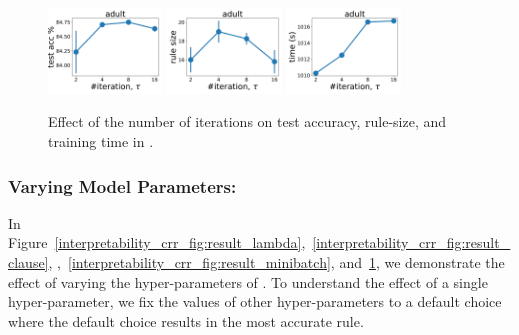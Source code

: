 \begin{figure}[t]
	\subfloat
	{\includegraphics[width=0.27\textwidth]{figures/interpretability/relaxed-cnf/adult_test_accuracy_vary_iteration.pdf}}
	\subfloat
	{\includegraphics[width=0.27\textwidth]{figures/interpretability/relaxed-cnf/adult_rule_size_vary_iteration.pdf}}
	\subfloat
	{\includegraphics[width=0.27\textwidth]{figures/interpretability/relaxed-cnf/adult_time_vary_iteration.pdf}} 
	\\
	
	
	\caption[Effect of the number of iterations in {\crr}]{Effect of the number of iterations on test accuracy, rule-size, and training time in {\crr}. } 
	\label{interpretability_crr_fig:result_iteration}
\end{figure}





	

	\subsubsection*{Varying Model Parameters: }
	\label{interpretability_crr_sec:model_parameters}
	In Figure~\ref{interpretability_crr_fig:result_lambda},~\ref{interpretability_crr_fig:result_clause}, ,~\ref{interpretability_crr_fig:result_minibatch}, and~\ref{interpretability_crr_fig:result_iteration}, we demonstrate the effect of varying the hyper-parameters of {\crr}. To understand the effect of a single hyper-parameter, we fix the values of other hyper-parameters to a default choice where the default choice results in the most accurate rule. 
	 

